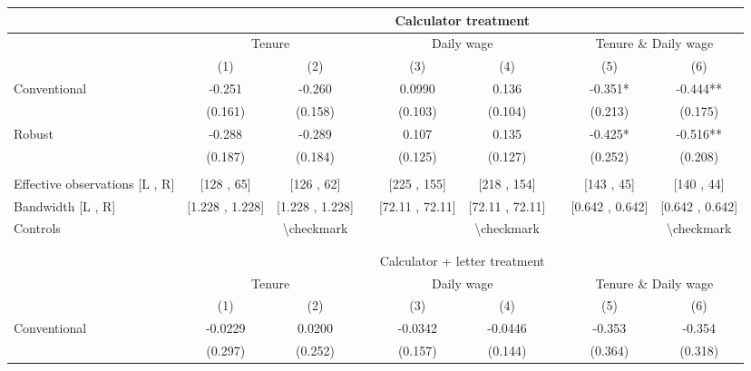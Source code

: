 \begin{tabular}{lcccccccc}
\toprule
      & \multicolumn{8}{c}{Calculator treatment} \\
\midrule
      & \multicolumn{2}{c}{Tenure} &       & \multicolumn{2}{c}{Daily wage} &       & \multicolumn{2}{c}{Tenure \& Daily wage} \\
\cmidrule{2-3}\cmidrule{5-6}\cmidrule{8-9}      & (1)   & (2)   &       & (3)   & (4)   &       & (5)   & (6) \\
\midrule
\midrule
Conventional & -0.251 & -0.260 &       & 0.0990 & 0.136 &       & -0.351* & -0.444** \\
      & (0.161) & (0.158) &       & (0.103) & (0.104) &       & (0.213) & (0.175) \\
Robust & -0.288 & -0.289 &       & 0.107 & 0.135 &       & -0.425* & -0.516** \\
      & (0.187) & (0.184) &       & (0.125) & (0.127) &       & (0.252) & (0.208) \\
      &       &       &       &       &       &       &       &  \\
\midrule
Effective observations [L , R] & [128 ,  65] & [126 ,  62] &       & [225 ,  155] & [218 ,  154] &       & [143 ,  45] & [140 ,  44] \\
Bandwidth [L , R] & [1.228 ,  1.228] & [1.228 ,  1.228] &       & [72.11 ,  72.11] & [72.11 ,  72.11] &       & [0.642 ,  0.642] & [0.642 ,  0.642] \\
Controls &       & \textbackslash{}checkmark &       &       & \textbackslash{}checkmark &       &       & \textbackslash{}checkmark \\
\midrule
\midrule
      &       &       &       &       &       &       &       &  \\
      &       &       &       &       &       &       &       &  \\
\midrule
      & \multicolumn{8}{c}{Calculator + letter treatment} \\
\midrule
      & \multicolumn{2}{c}{Tenure} &       & \multicolumn{2}{c}{Daily wage} &       & \multicolumn{2}{c}{Tenure \& Daily wage} \\
\cmidrule{2-3}\cmidrule{5-6}\cmidrule{8-9}      & (1)   & (2)   &       & (3)   & (4)   &       & (5)   & (6) \\
\midrule
\midrule
Conventional & -0.0229 & 0.0200 &       & -0.0342 & -0.0446 &       & -0.353 & -0.354 \\
      & (0.297) & (0.252) &       & (0.157) & (0.144) &       & (0.364) & (0.318) \\

\end{tabular}
